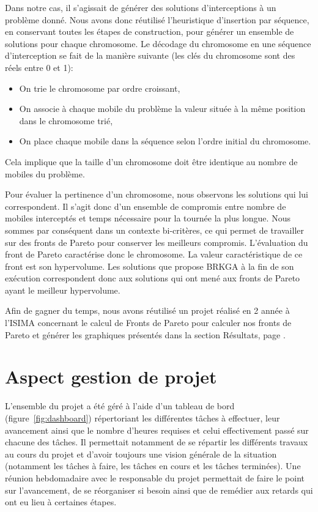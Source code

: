 			Dans notre cas, il s'agissait de générer des solutions d'interceptions à un problème donné. Nous avons donc réutilisé l'heuristique d'insertion par séquence, en conservant toutes les étapes de construction, pour générer un ensemble de solutions pour chaque chromosome.
			Le décodage du chromosome en une séquence d'interception se fait de la manière suivante (les clés du chromosome sont des réels entre 0 et 1):
			\begin{itemize}
				\item On trie le chromosome par ordre croissant,
				\item On associe à chaque mobile du problème la valeur située à la même position dans le chromosome trié,
				\item On place chaque mobile dans la séquence selon l'ordre initial du chromosome.
			\end{itemize}
			Cela implique que la taille d'un chromosome doit être identique au nombre de mobiles du problème.

			Pour évaluer la pertinence d'un chromosome, nous observons les solutions qui lui correspondent. Il s'agit donc d'un ensemble de compromis entre nombre de mobiles interceptés et temps nécessaire pour la tournée la plus longue. Nous sommes par conséquent dans un contexte bi-critères, ce qui permet de travailler sur des fronts de Pareto pour conserver les meilleurs compromis. L'évaluation du front de Pareto caractérise donc le chromosome. La valeur caractéristique de ce front est son hypervolume. Les solutions que propose BRKGA à la fin de son exécution correspondent donc aux solutions qui ont mené aux fronts de Pareto ayant le meilleur hypervolume.

			Afin de gagner du temps, nous avons réutilisé un projet réalisé en 2\ieme{} année à l'ISIMA concernant le calcul de Fronts de Pareto \cite{projet-zz2} pour calculer nos fronts de Pareto et générer les graphiques présentés dans la section Résultats, page \pageref{chap:resultats}.

	\section{Aspect gestion de projet}

		L'ensemble du projet a été géré à l'aide d'un tableau de bord (figure~\ref{fig:dashboard}) répertoriant les différentes tâches à effectuer, leur avancement ainsi que le nombre d'heures requises et celui effectivement passé sur chacune des tâches. Il permettait notamment de se répartir les différents travaux au cours du projet et d'avoir toujours une vision générale de la situation (notamment les tâches à faire, les tâches en cours et les tâches terminées). Une réunion hebdomadaire avec le responsable du projet permettait de faire le point sur l'avancement, de se réorganiser si besoin ainsi que de remédier aux retards qui ont eu lieu à certaines étapes. 
		
